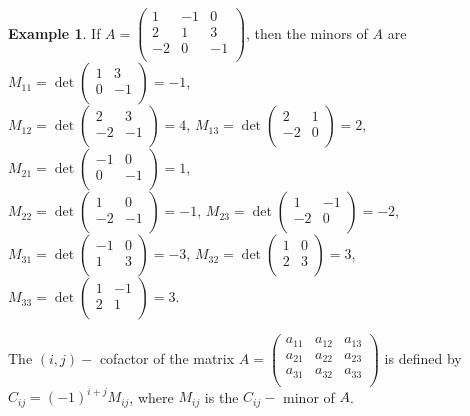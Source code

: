 \documentclass[11pt,a4paper]{article}
\theoremstyle{definition}
\newtheorem{exa}[thm]{Example}
\begin{document}
\begin{exa}
If $A=
\begin{pmatrix}
1&-1&0\\2&1&3\\-2&0&-1\\
\end{pmatrix}
$, then the minors of $A$ are $M_{11}=\det
\begin{pmatrix}
1&3\\0&-1\\
\end{pmatrix}
=-1$,\\ $M_{12}=\det
\begin{pmatrix}
2&3\\-2&-1\\
\end{pmatrix}
=4$, $M_{13}=\det
\begin{pmatrix}
2&1\\-2&0\\
\end{pmatrix}
=2$, $M_{21}=\det
\begin{pmatrix}
-1&0\\0&-1\\
\end{pmatrix}
=1$,\\ $M_{22}=\det
\begin{pmatrix}
1&0\\-2&-1\\
\end{pmatrix}
=-1$, $M_{23}=\det
\begin{pmatrix}
1&-1\\-2&0\\
\end{pmatrix}
=-2$, $M_{31}=\det
\begin{pmatrix}
-1&0\\1&3\\
\end{pmatrix}
=-3$, $M_{32}=\det
\begin{pmatrix}
1&0\\2&3\\
\end{pmatrix}
=3$, $M_{33}=\det
\begin{pmatrix}
1&-1\\2&1\\
\end{pmatrix}
=3$.

The $(i,j)-$ cofactor of the matrix $A=
\begin{pmatrix}
a_{11}&a_{12}&a_{13}\\a_{21}&a_{22}&a_{23}\\a_{31}&a_{32}&a_{33}\\
\end{pmatrix}
$ is defined by $C_{ij}=(-1)^{i+j}M_{ij}$, where $M_{ij}$ is the $C_{ij}-$ minor of $A$.
\end{exa}
\end{document}
